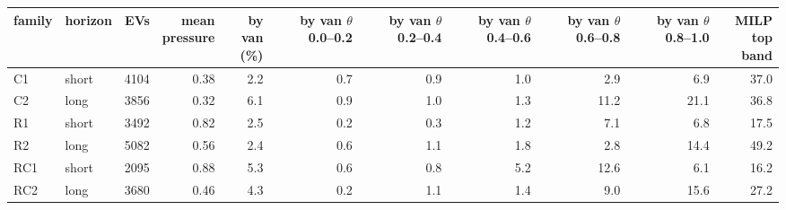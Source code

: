 \begin{tabular}{@{}llrrrrrrrrr@{}}
\toprule
family & horizon & EVs & \shortstack[r]{mean\\pressure} & \shortstack[r]{by van\\(\%)} & \shortstack[r]{by van\\$\theta$ 0.0--0.2} & \shortstack[r]{by van\\$\theta$ 0.2--0.4} & \shortstack[r]{by van\\$\theta$ 0.4--0.6} & \shortstack[r]{by van\\$\theta$ 0.6--0.8} & \shortstack[r]{by van\\$\theta$ 0.8--1.0} & \shortstack[r]{MILP\\top band} \\
\midrule
C1 & short & 4104 & 0.38 & 2.2 & 0.7 & 0.9 & 1.0 & 2.9 & 6.9 & 37.0 \\
C2 & long & 3856 & 0.32 & 6.1 & 0.9 & 1.0 & 1.3 & 11.2 & 21.1 & 36.8 \\
R1 & short & 3492 & 0.82 & 2.5 & 0.2 & 0.3 & 1.2 & 7.1 & 6.8 & 17.5 \\
R2 & long & 5082 & 0.56 & 2.4 & 0.6 & 1.1 & 1.8 & 2.8 & 14.4 & 49.2 \\
RC1 & short & 2095 & 0.88 & 5.3 & 0.6 & 0.8 & 5.2 & 12.6 & 6.1 & 16.2 \\
RC2 & long & 3680 & 0.46 & 4.3 & 0.2 & 1.1 & 1.4 & 9.0 & 15.6 & 27.2 \\
\bottomrule
\end{tabular}
